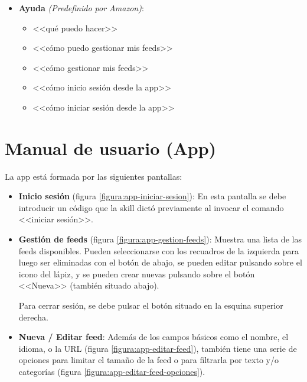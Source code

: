 \documentclass[11pt,spanish,listoffigures,listoftables,table,hyphens,dvipsnames]{tfgetsinf}
\begin{document}
\begin{itemize}
\begin{itemize}
   \end{itemize}
   \item \textbf{Ayuda} \emph{(Predefinido por Amazon)}:
   \begin{itemize}
      \item <<qué puedo hacer>>
      \item <<cómo puedo gestionar mis feeds>>
      \item <<cómo gestionar mis feeds>>
      \item <<cómo inicio sesión desde la app>>
      \item <<cómo iniciar sesión desde la app>>
   \end{itemize}
\end{itemize}

\chapter{Manual de usuario (App)}

La app está formada por las siguientes pantallas:

\begin{itemize}
   \item \textbf{Inicio sesión} (figura \ref{figura:app-iniciar-sesion}): En esta pantalla se debe introducir un código que la skill dictó previamente al invocar el comando <<iniciar sesión>>.
   \item \textbf{Gestión de feeds} (figura \ref{figura:app-gestion-feeds}): Muestra una lista de las feeds disponibles. Pueden seleccionarse con los recuadros de la izquierda para luego ser eliminadas con el botón de abajo, se pueden editar pulsando sobre el icono del lápiz, y se pueden crear nuevas pulsando sobre el botón <<Nueva>> (también situado abajo).
   
   Para cerrar sesión, se debe pulsar el botón situado en la esquina superior derecha.
   \item \textbf{Nueva / Editar feed}: Además de los campos básicos como el nombre, el idioma, o la URL (figura \ref{figura:app-editar-feed}), también tiene una serie de opciones para limitar el tamaño de la feed o para filtrarla por texto y/o categorías (figura \ref{figura:app-editar-feed-opciones}).
\end{itemize}
\end{document}
